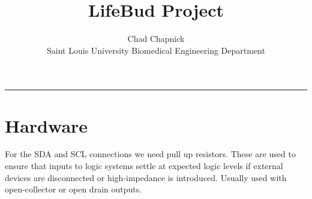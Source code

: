 \documentclass{article}
\begin{document}
\title{LifeBud Project}
\author{Chad Chapnick \\ 
        Saint Louis University Biomedical Engineering Department}
\maketitle
\vspace{-0.75cm}
\noindent\hfil\rule{0.5\textwidth}{.4pt}\hfil

\section*{Hardware}


For the SDA and SCL connections we need pull up resistors. 
These are used to ensure that inputs to logic systems settle at expected logic levels if external devices are disconnected 
or high-impedance is introduced. Usually used with open-collector or open drain outputs.
\end{document}
